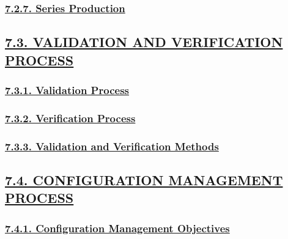 \documentclass[
]{article}
\begin{document}
\hypertarget{series-production}{%
\subsubsection{\texorpdfstring{\protect\hyperlink{series-production-1}{7.2.7.
Series Production}}{7.2.7. Series Production}}\label{series-production}}

\hypertarget{validation-and-verification-process}{%
\subsection{\texorpdfstring{\protect\hyperlink{validation-and-verification-process-1}{7.3.
VALIDATION AND VERIFICATION
PROCESS}}{7.3. VALIDATION AND VERIFICATION PROCESS}}\label{validation-and-verification-process}}

\hypertarget{validation-process}{%
\subsubsection{\texorpdfstring{\protect\hyperlink{validation-process-1}{7.3.1.
Validation
Process}}{7.3.1. Validation Process}}\label{validation-process}}

\hypertarget{verification-process}{%
\subsubsection{\texorpdfstring{\protect\hyperlink{verification-process-1}{7.3.2.
Verification
Process}}{7.3.2. Verification Process}}\label{verification-process}}

\hypertarget{validation-and-verification-methods}{%
\subsubsection{\texorpdfstring{\protect\hyperlink{validation-and-verification-methods-1}{7.3.3.
Validation and Verification
Methods}}{7.3.3. Validation and Verification Methods}}\label{validation-and-verification-methods}}

\hypertarget{configuration-management-process}{%
\subsection{\texorpdfstring{\protect\hyperlink{configuration-management-process-1}{7.4.
CONFIGURATION MANAGEMENT
PROCESS}}{7.4. CONFIGURATION MANAGEMENT PROCESS}}\label{configuration-management-process}}

\hypertarget{configuration-management-objectives}{%
\subsubsection{\texorpdfstring{\protect\hyperlink{configuration-management-objectives-1}{7.4.1.
Configuration Management
Objectives}}{7.4.1. Configuration Management Objectives}}\label{configuration-management-objectives}}
\end{document}
